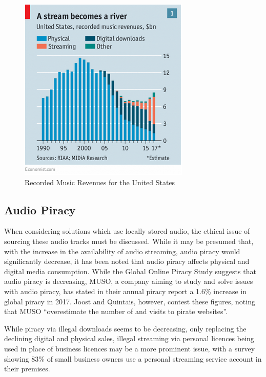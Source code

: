 \documentclass[11pt,a4paper,headinclude=false,footinclude=false]{scrreprt}
\begin{document}
\begin{figure}[H]
\includegraphics{Ethics/StreamBecomesRiver.png}
\centering
\caption{Recorded Music Revenues for the United States \cite{SpotPay18}}
\label{StreamBecomesRiver}
\end{figure}

\subsection{Audio Piracy}\label{audio-piracy}

When considering solutions which use locally stored audio, the ethical
issue of sourcing these audio tracks must be discussed. While it may be
presumed that, with the increase in the availability of audio streaming,
audio piracy would significantly decrease, it has been noted that audio
piracy affects physical and digital media
consumption\cite{onlinePiracy}. While the Global Online Piracy
Study\cite{onlinePiracy} suggests that audio piracy is decreasing, MUSO,
a company aiming to study and solve issues with audio piracy, has stated
in their annual piracy report a 1.6\% increase in global piracy in
2017\cite{muso}. Joost and Quintais, however, contest these figures,
noting that MUSO ``overestimate the number of and visits to pirate
websites''\cite{onlinePiracy}.

While piracy via illegal downloads seems to be decreasing, only
replacing the declining digital and physical sales\cite{SpotPay18},
illegal streaming via personal licences being used in place of business
licences may be a more prominent issue, with a survey showing 83\% of
small business owners use a personal streaming service account in their
premises\cite{licence}.
\end{document}

